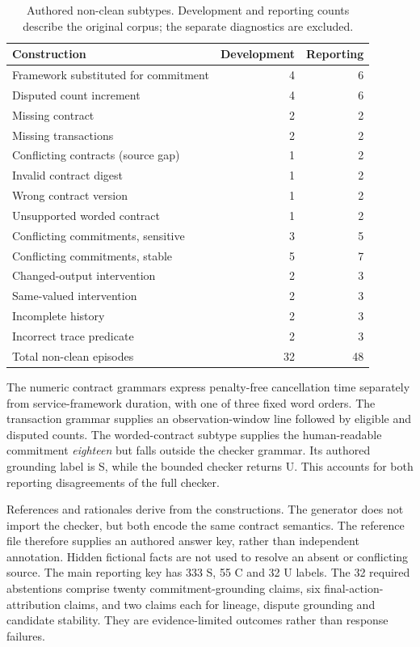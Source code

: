 \begin{table}[t]
\caption{Authored non-clean subtypes. Development and reporting counts describe the original corpus; the separate diagnostics are excluded.}
\label{tab:supp-faults}
\small
\begin{tabularx}{\columnwidth}{@{}Xrr@{}}
\toprule
Construction & Development & Reporting\\
\midrule
Framework substituted for commitment & 4 & 6\\
Disputed count increment & 4 & 6\\
Missing contract & 2 & 2\\
Missing transactions & 2 & 2\\
Conflicting contracts (source gap) & 1 & 2\\
Invalid contract digest & 1 & 2\\
Wrong contract version & 1 & 2\\
Unsupported worded contract & 1 & 2\\
Conflicting commitments, sensitive & 3 & 5\\
Conflicting commitments, stable & 5 & 7\\
Changed-output intervention & 2 & 3\\
Same-valued intervention & 2 & 3\\
Incomplete history & 2 & 3\\
Incorrect trace predicate & 2 & 3\\
\midrule
Total non-clean episodes & 32 & 48\\
\bottomrule
\end{tabularx}
\end{table}

The numeric contract grammars express penalty-free cancellation time separately from service-framework duration, with one of three fixed word orders. The transaction grammar supplies an observation-window line followed by eligible and disputed counts. The worded-contract subtype supplies the human-readable commitment \emph{eighteen} but falls outside the checker grammar. Its authored grounding label is S, while the bounded checker returns U. This accounts for both reporting disagreements of the full checker.

References and rationales derive from the constructions. The generator does not import the checker, but both encode the same contract semantics. The reference file therefore supplies an authored answer key, rather than independent annotation. Hidden fictional facts are not used to resolve an absent or conflicting source. The main reporting key has 333 S, 55 C and 32 U labels. The 32 required abstentions comprise twenty commitment-grounding claims, six final-action-attribution claims, and two claims each for lineage, dispute grounding and candidate stability. They are evidence-limited outcomes rather than response failures.

